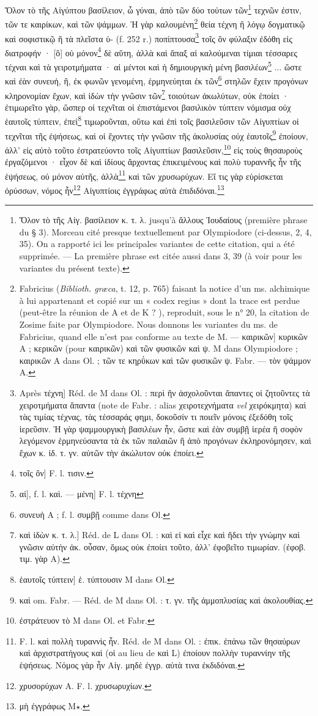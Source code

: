 \documentclass[landscape, a4paper, 11pt, oneside, polutonikogreek, french]{article}
\begin{document}
Ὅλον τὸ τῆς Αἰγύπτου βασίλειον, ὦ γύναι, ἀπὸ τῶν δύο τούτων τῶν\footnote{Ὅλον τὸ τῆς Αἰγ. βασίλειον κ. τ. λ. jusqu'à ἄλλους Ἰουδαίους (première phrase du § 3). Morceau cité presque textuellement par Olympiodore (ci-dessus, 2, 4, 35). On a rapporté ici les principales variantes de cette citation, qui a été supprimée. --- La première phrase est citée aussi dans 3, 39 (à voir pour les variantes du présent texte).} τεχνῶν ἐστιν, τῶν τε καιρίκων, καὶ τῶν ψάμμων. Ἡ γὰρ καλουμένη\footnote{Fabricius (\emph{Biblioth. græca}, t. 12, p. 765) faisant la notice d'un ms. alchimique à lui appartenant et copié sur un « codex regius » dont la trace est perdue (peut-être la réunion de A et de K ? ), reproduit, sous le n° 20, la citation de Zosime faite par Olympiodore. Nous donnons les variantes du ms. de Fabricius, quand elle n'est pas conforme au texte de M. --- καιρικῶν] κυρικῶν A ; κερικῶν (pour καιρικῶν) καὶ τῶν φυσικῶν καὶ ψ. M dans Olympiodore ; καιρικῶν A dans Ol. ; τῶν τε κηρΰκων καὶ τῶν φυσικῶν ψ. Fabr. --- τὸν ψάμμον A.} θεία τέχνη ἢ λόγῳ δογματικῷ καὶ σοφιστικῷ ἢ τὰ πλεῖστα ὑ- (f. 252 r.) ποπίπτουσα\footnote{Après τέχνη] Réd. de M dans Ol. : περὶ ἣν ἀσχολοῦνται ἅπαντες οἱ ζητοῦντες τὰ χειροτμήματα ἅπαντα (note de Fabr. : alias χειροτεχνήματα \emph{vel} χειρόκμητα) καὶ τὰς τιμίας τέχνας, τὰς τέσσαράς φημι, δοκοῦσίν τι ποιεῖν μόνοις ἐξεδόθη τοῖς ἱερεῦσιν. Ἡ γὰρ ψαμμουργικὴ βασιλέων ἦν, ὥστε καὶ ἐὰν συμβῇ ἱερέα ἢ σοφὸν λεγόμενον ἑρμηνεύσαντα τὰ ἐκ τῶν παλαιῶν ἢ ἀπὸ προγόνων ἐκληρονόμησεν, καὶ ἔχων κ. ἰδ. τ. γν. αὐτῶν τὴν ἀκώλυτον οὐκ ἐποίει.} τοῖς ὃν φύλαξιν ἐδόθη εἰς διατροφήν · [ὃ] οὐ μόνον\footnote{τοῖς ὂν] F. l. τισιν.} δὲ αὕτη, ἀλλὰ καὶ ἅπαξ αἱ καλούμεναι τίμιαι τέσσαρες τέχναι καὶ τὰ γειροτμήματα · αἰ μέντοι καὶ ἡ δημιουργικὴ μένη βασιλέων\footnote{αἰ], f. l. καὶ. --- μένη] F. l. τέχνη} ... ὥστε καὶ ἐὰν συνευἠ, ἢ, ἐκ φωνῶν γενομένη, ἑρμηνεύηται ἐκ τῶν\footnote{συνευὴ A ; f. l. συμβῇ comme dans Ol.} στηλῶν ἔχειν προγόνων κληρονομίαν ἔχων, καὶ ἰδὼν τὴν γνῶσιν τῶν\footnote{καὶ ἰδὼν κ. τ. λ.] Réd. de L dans Ol. : καὶ εἰ καὶ εἶχε καὶ ἤδει τὴν γνώμην καὶ γνῶσιν αὐτὴν ἀκ. οὖσαν, ὅμως οὐκ ἐποίει τοῦτο, ἀλλ' ἐφοβεῖτο τιμωρίαν. (ἐφοβ. τιμ. γὰρ A).} τοιούτων ἀκωλύτων, οὐκ ἐποίει · ἐτιμωρεῖτο γὰρ, ὥσπερ οἱ τεχνῖται οἱ ἐπιστάμενοι βασιλικὸν τύπτειν νόμισμα οὐχ ἑαυτοῖς τύπτειν, ἐπεὶ\footnote{ἑαυτοῖς τύπτειν] ἑ. τύπτουσιν M dans Ol.} τιμωροῦνται, οὕτω καὶ ἐπὶ τοῖς βασιλεῦσιν τῶν Αἰγυπτίων οἱ τεχνῖται τῆς ἐψήσεως, καὶ οἱ ἔχοντες τὴν γνῶσιν τῆς ἀκολυσίας οὐχ ἑαυτοῖς\footnote{καὶ om. Fabr. --- Réd. de M dans Ol. : τ. γν. τῆς ἀμμοπλυσίας καὶ ἀκολουθίας.} ἐποίουν, ἀλλ' εἰς αὐτὸ τοῦτο ἐστρατεύοντο τοῖς Αἰγυπτίων βασιλεῦσιν,\footnote{ἐστράτευον τὸ M dans Ol. et Fabr.} εἰς τοὺς θησαυροὺς ἐργαζόμενοι · εἶχον δὲ καὶ ἰδίους ἄρχοντας ἐπικειμένους καὶ πολὺ τυραννῆς ἦν τῆς ἑψήσεως, οὐ μόνον αὐτῆς, ἀλλὰ\footnote{F. l. καὶ πολλὴ τυραννὶς ἦν. Réd. de M dans Ol. : ἐπικ. ἐπάνω τῶν θησαύρων καὶ ἀρχιστρατήγους καὶ (οἱ au lieu de καὶ L) ἐποίουν πολλὴν τυραννίην τῆς ἑψήσεως. Νόμος γὰρ ἦν Αἰγ. μηδὲ ἐγγρ. αὐτὰ τινα ἐκδιδόναι.} καὶ τῶν χρυσωρύχων. Εἴ τις γὰρ εὑρίσκεται ὀρύσσων, νόμος ἧν\footnote{χρυσορύχων A. F. l. χρυσωρυχίων.} Αἰγυπτίοις ἐγγράφως αὐτὰ ἐπιδιδόναι.\footnote{μὴ ἐγγράφως M$\star$.}
\end{document}
